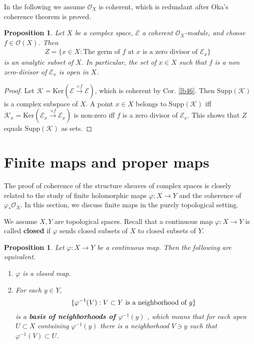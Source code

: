 \documentclass[12pt,b5paper,notitlepage]{report}
\theoremstyle{definition}
\theoremstyle{plain}
\newtheorem{pp}[df]{Proposition}
\newcommand{\scr}{\mathscr}
\newcommand{\Ker}{\mathrm{Ker}}
\newcommand{\Supp}{\mathrm{Supp}}
\numberwithin{equation}{section}
\begin{document}
In the following we assume $\scr O_X$ is coherent, which is redundant after Oka's coherence theorem is proved.

\begin{pp}\label{lb113}
Let $X$ be a complex space, $\scr E$ a coherent $\scr O_X$-module, and choose $f\in\scr O(X)$. Then 
\begin{align*}
Z=\{x\in X:\text{The germ of $f$ at $x$ is a zero divisor of $\scr E_x$}\}
\end{align*}
is an analytic subset of $X$. In particular, the set of $x\in X$ such that $f$ is a non zero-divisor of $\scr E_x$ is open in $X$.
\end{pp}


\begin{proof}
Let $\scr K=\Ker(\scr E\xrightarrow{\times f}\scr E)$, which is coherent by Cor. \ref{lb46}. Then $\Supp(\scr K)$ is a complex subspace of $X$. A point $x\in X$ belongs to $\Supp(\scr K)$ iff $\scr K_x=\Ker(\scr E_x\xrightarrow{\times f}\scr E_x)$ is non-zero iff $f$ is a zero divisor of $\scr E_x$. This shows that $Z$ equals $\Supp(\scr K)$ as sets.
\end{proof}














\section{Finite maps and proper maps}

The proof of coherence of the structure sheaves of complex spaces is closely related to the study of finite holomorphic maps $\varphi:X\rightarrow Y$ and the coherence of $\varphi_*\scr O_X$. In this section, we discuss finite maps in the purely topological setting. 

We assume $X,Y$ are topological spaces. Recall that a continuous map $\varphi:X\rightarrow Y$ is called \textbf{closed} if $\varphi$ sends closed subsets of $X$ to closed subsets of $Y$. 





\begin{pp}\label{lb54}
Let $\varphi:X\rightarrow Y$ be a continuous map. Then the following are equivalent.
\begin{enumerate}[label=(\arabic*)]
\item $\varphi$ is a closed map.
\item For each $y\in Y$,
\begin{align*}
\{\varphi^{-1}(V):V\subset Y\text{\normalfont{ is a neighborhood of }}y\}
\end{align*}
is a \textbf{basis of neighborhoods of $\varphi^{-1}(y)$} , which means that for each open $U\subset X$ containing $\varphi^{-1}(y)$ there is a neighborhood $V\ni y$ such that $\varphi^{-1}(V)\subset U$.
\end{enumerate}
\end{pp}
\end{document}
